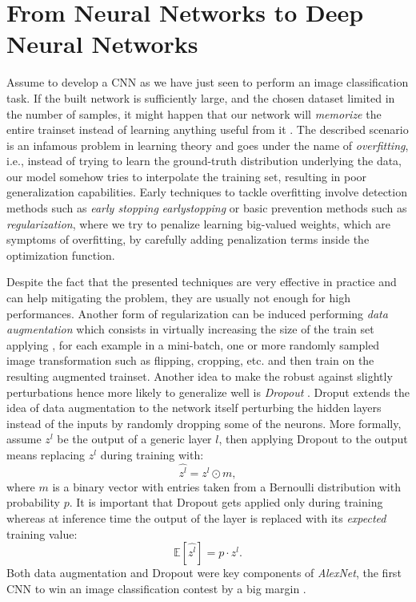 \documentclass[LaM,binding=0.6cm]{./packages/sapthesis/sapthesis}
\begin{document}
        \section{From Neural Networks to Deep Neural Networks}
        \label{dnns}
        Assume to develop a CNN as we have just seen to perform an image classification task. If the built network is sufficiently large, and the chosen dataset limited
        in the number of samples, it might happen that our network will \textit{memorize} the entire trainset instead of learning anything useful from it \cite{overfitting}. The described scenario is an infamous problem in learning theory and goes under the name of \textit{overfitting},
        i.e., instead of trying to learn the ground-truth distribution underlying the data, our model somehow tries to interpolate the training set, 
        resulting in poor generalization capabilities. 
        Early techniques to tackle overfitting involve detection methods such as \textit{early stopping} \textit{earlystopping} 
        or basic prevention methods such as \textit{regularization}\cite{regularization},
        where we try to penalize learning big-valued weights, which are symptoms of overfitting, by carefully adding penalization terms inside the optimization function.

        Despite the fact that the presented techniques are very effective in practice and can help mitigating the problem, they are usually not enough for high performances.
        Another form of regularization can be induced performing \textit{data augmentation} \cite{cnn} which consists in virtually increasing the size of the train set applying
        , for each example in a mini-batch, one or more randomly sampled image transformation such as flipping, cropping, etc. and then train on the resulting augmented
        trainset. Another idea to make the robust against slightly perturbations hence more likely to generalize well is \textit{Dropout} \cite{cnn}.
        Droput extends the idea of data augmentation to the network itself perturbing the hidden layers instead of the inputs by randomly dropping some of the
        neurons. More formally, assume $z^l$ be the output of a generic layer $l$, then applying Dropout to the output means replacing $z^l$ during
        training with:
        \begin{equation}
            \hat{z^l} = z^l \odot m,
        \end{equation}
        where $m$ is a binary vector with entries taken from a Bernoulli distribution with probability $p$. It is important that Dropout gets applied only
        during training whereas at inference time the output of the layer is replaced with its \textit{expected} training value:
        \begin{equation}
            \mathbb{E}[\hat{z^l}] = p \cdot z^l. 
        \end{equation}
        Both data augmentation and Dropout were key components of \textit{AlexNet}, the first CNN to win an image classification
        contest by a big margin \cite{cnn}.
\end{document}
